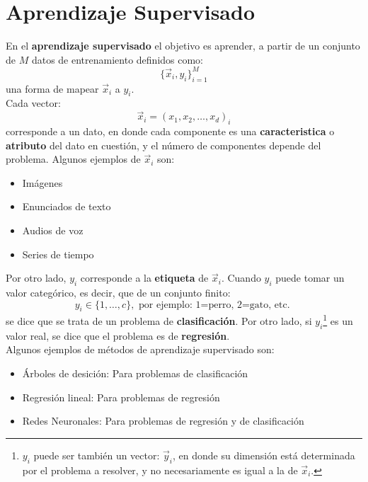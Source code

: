 \section{Aprendizaje Supervisado}
En el \textbf{aprendizaje supervisado} el objetivo es aprender, a partir de un conjunto de $M$ datos de entrenamiento definidos como:
\begin{equation}
\{\vec{x}_i, y_i\}_{i=1}^{M}
\end{equation}
una forma de mapear $\vec{x}_i$ a $y_i$.
\\
Cada vector:
\begin{equation}
\vec{x}_i = (x_1,x_2, \dots , x_d)_i\label{eq:trainset}
\end{equation}
corresponde a un dato, en donde cada componente es una \textbf{caracteristica} o \textbf{atributo} del dato en cuestión, y el número de componentes depende del problema. Algunos ejemplos de $\vec{x}_i$ son:
\begin{itemize}[label=\textcolor{CTtitle}{\textbullet}]
\item Imágenes
\item Enunciados de texto
\item Audios de voz
\item Series de tiempo
\end{itemize}

Por otro lado, $y_i$ corresponde a la \textbf{etiqueta} de $\vec{x}_i$. Cuando $y_i$ puede tomar un valor categórico, es decir, que de un conjunto finito:
$$y_i \in \{1,\dots,c\}, \text{  por ejemplo: 1=perro, 2=gato, etc. }$$ 
se dice que se trata de un problema de \textbf{clasificación}. Por otro lado, si $y_i$\footnote{$y_i$ puede ser también un vector: $\vec{y}_i$, en donde su dimensión está determinada por el problema a resolver, y no necesariamente es igual a la de $\vec{x}_i$.} es un valor real, se dice que el problema es de \textbf{regresión}.
\\

Algunos ejemplos de métodos de aprendizaje supervisado son:
\begin{itemize}[label=\textcolor{CTtitle}{\textbullet}]
\item Árboles de desición: Para problemas de clasificación
\item Regresión lineal: Para problemas de regresión
\item Redes Neuronales: Para problemas de regresión y de clasificación
\end{itemize}

